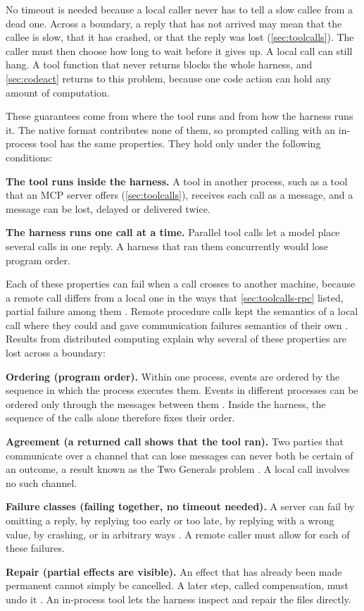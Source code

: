 No timeout is needed because a local caller never has to tell a slow callee from a dead one. Across
a boundary, a reply that has not arrived may mean that the callee is slow, that it has crashed, or
that the reply was lost (\cref{sec:toolcalls}). The caller must then choose how long to wait before
it gives up. A local call can still hang. A tool function that never returns blocks the whole
harness, and \cref{sec:codeact} returns to this problem, because one code action can hold any amount
of computation.

These guarantees come from where the tool runs and from how the harness runs it. The native format
contributes none of them, so prompted calling with an in-process tool has the same properties. They
hold only under the following conditions:
\bi
\item \textbf{The tool runs inside the harness.} A tool in another process, such as a tool that an
MCP server offers (\cref{sec:toolcalls}), receives each call as a message, and a message can be lost,
delayed or delivered twice.
\item \textbf{The harness runs one call at a time.} Parallel tool calls let a model place several
calls in one reply. A harness that ran them concurrently would lose program order.
\ei

Each of these properties can fail when a call crosses to another machine, because a remote call
differs from a local one in the ways that \cref{sec:toolcalls-rpc} listed, partial failure among
them \citep{waldo1994note}. Remote procedure calls kept the semantics of a local call where they could and
gave communication failures semantics of their own \citep{birrell1984rpc}. Results from distributed
computing explain why several of these properties are lost across a boundary:
\bi
\item \textbf{Ordering (program order).} Within one process, events are ordered by the sequence in which the process
executes them. Events in different processes can be ordered only through the messages between them
\citep{lamport1978time}. Inside the harness, the sequence of the calls alone therefore fixes their
order.
\item \textbf{Agreement (a returned call shows that the tool ran).} Two parties that communicate over a channel that can lose messages can
never both be certain of an outcome, a result known as the Two Generals problem
\citep{akkoyunlu1975constraints,gray1978notes}. A local call involves no such channel.
\item \textbf{Failure classes (failing together, no timeout needed).} A server can fail by omitting a reply, by replying too early or too
late, by replying with a wrong value, by crashing, or in arbitrary ways
\citep{cristian1991understanding}. A remote caller must allow for each of these failures.
\item \textbf{Repair (partial effects are visible).} An effect that has already been made permanent cannot simply be cancelled. A
later step, called compensation, must undo it \citep{garciamolina1987sagas}. An in-process tool lets
the harness inspect and repair the files directly.
\ei

